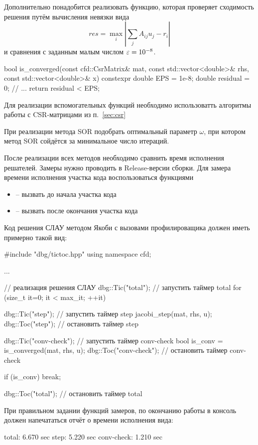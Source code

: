 Дополнительно понадобится реализовать функцию, которая проверяет сходимость решения
путём вычисления невязки вида
\begin{equation*}
res = \max_i{\left| \sum_{j}A_{ij} u_j - r_i \right|}
\end{equation*}
и сравнения с заданным малым числом $\varepsilon=10^{-8}$.
\begin{cppcode}
bool is_converged(const cfd::CsrMatrix& mat, const std::vector<double>& rhs, const std::vector<double>& x){
	constexpr double EPS = 1e-8;
	double residual = 0;
	// ...
	return residual < EPS;
}
\end{cppcode}

Для реализации вспомогательных функций необходимо
использоватть алгоритмы работы с CSR-матрицами из п.~\ref{sec:csr}

При реализации метода SOR подобрать оптимальный параметр $\omega$,
при котором метод SOR сойдётся за минимальное число итераций.

После реализации всех методов необходимо
сравнить время исполнения решателей. Замеры нужно проводить в Release-версии сборки.
Для замера времени исполнения участка кода воспользоваться функциями
\begin{itemize}
\item {} -- вызвать до начала участка кода
\item {} -- вызвать после окончания участка кода
\end{itemize}

Код решения СЛАУ методом Якоби с вызовами профилироващика
должен иметь примерно такой вид:
\begin{cppcode}
#include "dbg/tictoc.hpp"
using namespace cfd;

...

// реализация решения СЛАУ
dbg::Tic("total");  // запустить таймер total
for (size_t it=0; it < max_it; ++it){
	dbg::Tic("step");  // запустить таймер step
	jacobi_step(mat, rhs, u);
	dbg::Toc("step");  // остановить таймер step

	dbg::Tic("conv-check");  // запустить таймер conv-check
	bool is_conv = is_converged(mat, rhs, u);
	dbg::Toc("conv-check");  // остановить таймер conv-check

	if (is_conv) break;
}
dbg::Toc("total");  // остановить таймер total
\end{cppcode}

При правильном задании функций замеров, по окончанию работы в консоль должен напечататься отчёт о времени исполнения вида:
\begin{shelloutput}
     total:  6.670 sec
      step:  5.220 sec
conv-check:  1.210 sec
\end{shelloutput}

